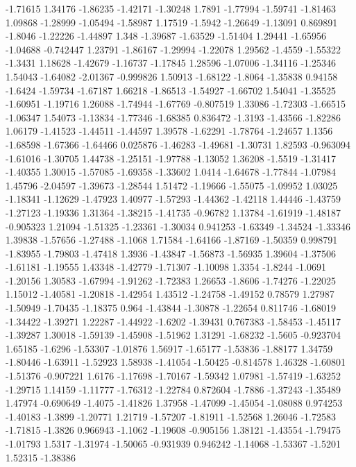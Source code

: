 \documentclass[9pt]{article}
\theoremstyle{plain}
\theoremstyle{definition}
\theoremstyle{remark}
\numberwithin{equation}{section}
\begin{document}
-1.71615
1.34176
-1.86235
-1.42171
-1.30248
1.7891
-1.77994
-1.59741
-1.81463
1.09868
-1.28999
-1.05494
-1.58987
1.17519
-1.5942
-1.26649
-1.13091
0.869891
-1.8046
-1.22226
-1.44897
1.348
-1.39687
-1.63529
-1.51404
1.29441
-1.65956
-1.04688
-0.742447
1.23791
-1.86167
-1.29994
-1.22078
1.29562
-1.4559
-1.55322
-1.3431
1.18628
-1.42679
-1.16737
-1.17845
1.28596
-1.07006
-1.34116
-1.25346
1.54043
-1.64082
-2.01367
-0.999826
1.50913
-1.68122
-1.8064
-1.35838
0.94158
-1.6424
-1.59734
-1.67187
1.66218
-1.86513
-1.54927
-1.66702
1.54041
-1.35525
-1.60951
-1.19716
1.26088
-1.74944
-1.67769
-0.807519
1.33086
-1.72303
-1.66515
-1.06347
1.54073
-1.13834
-1.77346
-1.68385
0.836472
-1.3193
-1.43566
-1.82286
1.06179
-1.41523
-1.44511
-1.44597
1.39578
-1.62291
-1.78764
-1.24657
1.1356
-1.68598
-1.67366
-1.64466
0.025876
-1.46283
-1.49681
-1.30731
1.82593
-0.963094
-1.61016
-1.30705
1.44738
-1.25151
-1.97788
-1.13052
1.36208
-1.5519
-1.31417
-1.40355
1.30015
-1.57085
-1.69358
-1.33602
1.0414
-1.64678
-1.77844
-1.07984
1.45796
-2.04597
-1.39673
-1.28544
1.51472
-1.19666
-1.55075
-1.09952
1.03025
-1.18341
-1.12629
-1.47923
1.40977
-1.57293
-1.44362
-1.42118
1.44446
-1.43759
-1.27123
-1.19336
1.31364
-1.38215
-1.41735
-0.96782
1.13784
-1.61919
-1.48187
-0.905323
1.21094
-1.51325
-1.23361
-1.30034
0.941253
-1.63349
-1.34524
-1.33346
1.39838
-1.57656
-1.27488
-1.1068
1.71584
-1.64166
-1.87169
-1.50359
0.998791
-1.83955
-1.79803
-1.47418
1.3936
-1.43847
-1.56873
-1.56935
1.39604
-1.37506
-1.61181
-1.19555
1.43348
-1.42779
-1.71307
-1.10098
1.3354
-1.8244
-1.0691
-1.20156
1.30583
-1.67994
-1.91262
-1.72383
1.26653
-1.8606
-1.74276
-1.22025
1.15012
-1.40581
-1.20818
-1.42954
1.43512
-1.24758
-1.49152
0.78579
1.27987
-1.50949
-1.70435
-1.18375
0.964
-1.43844
-1.30878
-1.22654
0.811746
-1.68019
-1.34422
-1.39271
1.22287
-1.44922
-1.6202
-1.39431
0.767383
-1.58453
-1.45117
-1.39287
1.30018
-1.59139
-1.45908
-1.51962
1.31291
-1.68232
-1.5605
-0.923704
1.65185
-1.6296
-1.53307
-1.01876
1.56917
-1.65177
-1.53836
-1.88177
1.34759
-1.80446
-1.63911
-1.52923
1.58938
-1.41054
-1.50425
-0.814578
1.46328
-1.60801
-1.51376
-0.907221
1.6176
-1.17698
-1.70167
-1.59342
1.07981
-1.57419
-1.63252
-1.29715
1.14159
-1.11777
-1.76312
-1.22784
0.872604
-1.7886
-1.37243
-1.35489
1.47974
-0.690649
-1.4075
-1.41826
1.37958
-1.47099
-1.45054
-1.08088
0.974253
-1.40183
-1.3899
-1.20771
1.21719
-1.57207
-1.81911
-1.52568
1.26046
-1.72583
-1.71815
-1.3826
0.966943
-1.1062
-1.19608
-0.905156
1.38121
-1.43554
-1.79475
-1.01793
1.5317
-1.31974
-1.50065
-0.931939
0.946242
-1.14068
-1.53367
-1.5201
1.52315
-1.38386
\end{document}
